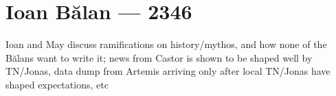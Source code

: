 \hypertarget{ioan-bux103lan-2346}{%
\chapter{Ioan Bălan — 2346}\label{ioan-bux103lan-2346}}

Ioan and May discuss ramifications on history/mythos, and how none of the Bălans want to write it; news from Castor is shown to be shaped well by TN/Jonas, data dump from Artemis arriving only after local TN/Jonas have shaped expectations, etc

